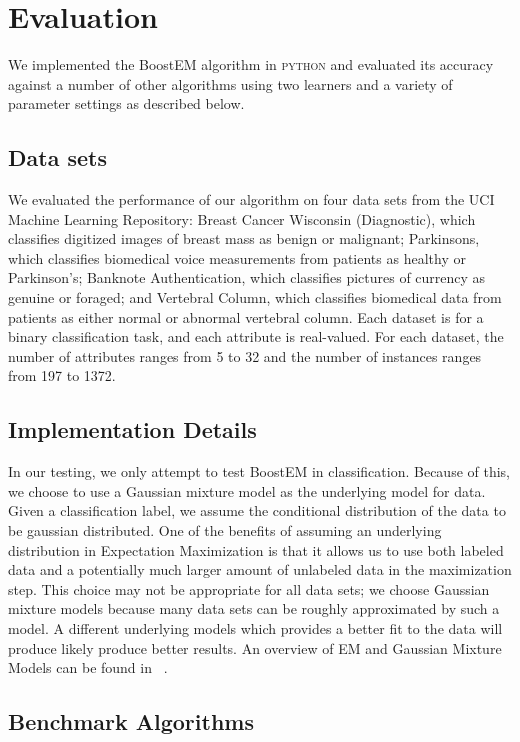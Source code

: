\documentclass{sig-alternate}
\begin{document}
\section{Evaluation}
We implemented the BoostEM algorithm in \textsc{python} and evaluated its accuracy against a number of other algorithms using two learners and a variety of parameter settings  as described below.


\subsection{Data sets}

We evaluated the performance of our algorithm on four data sets from the UCI Machine Learning Repository: Breast Cancer Wisconsin (Diagnostic), which classifies digitized images of breast mass as benign or malignant; Parkinsons, which classifies biomedical voice measurements from patients as healthy or Parkinson's; Banknote Authentication, which classifies pictures of currency as genuine or foraged; and Vertebral Column, which classifies biomedical data from patients as either normal or abnormal vertebral column. Each dataset is for a binary classification task, and each attribute is real-valued. For each dataset, the number of attributes ranges from 5 to 32 and the number of instances ranges from 197 to 1372. 

\subsection{Implementation Details}
In our testing, we only attempt to test BoostEM in classification.  Because of this, we choose to use a Gaussian mixture model as the underlying model for data. Given a classification label, we assume the conditional distribution of the data to be gaussian distributed. One of the benefits of assuming an underlying distribution in Expectation Maximization is that it allows us to use both labeled data and a potentially much larger amount of unlabeled data in the maximization step. This choice may not be appropriate for all data sets; we choose Gaussian mixture models because many data sets can be roughly approximated by such a model.  A different underlying models which provides a better fit to the data will produce likely produce better results.  An overview of EM and Gaussian Mixture Models can be found in ~\cite{zhu2009introduction}.

\subsection{Benchmark Algorithms}
\end{document}
